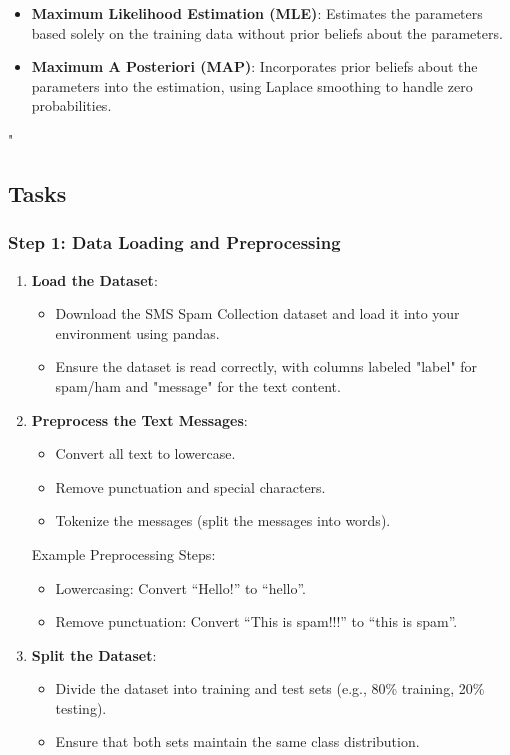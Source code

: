 \documentclass{article}
\begin{document}
\begin{itemize}
    \item \textbf{Maximum Likelihood Estimation (MLE)}: Estimates the parameters based solely on the training data without prior beliefs about the parameters.
    \item \textbf{Maximum A Posteriori (MAP)}: Incorporates prior beliefs about the parameters into the estimation, using Laplace smoothing to handle zero probabilities.
\end{itemize}

"

\subsection*{Tasks}

\subsubsection*{Step 1: Data Loading and Preprocessing}
\begin{enumerate}
    \item \textbf{Load the Dataset}:
    \begin{itemize}
        \item Download the SMS Spam Collection dataset and load it into your environment using pandas.
        \item Ensure the dataset is read correctly, with columns labeled "label" for spam/ham and "message" for the text content.
    \end{itemize}
    
    \item \textbf{Preprocess the Text Messages}:
    \begin{itemize}
        \item Convert all text to lowercase.
        \item Remove punctuation and special characters.
        \item Tokenize the messages (split the messages into words).
    \end{itemize}
    Example Preprocessing Steps:
    \begin{itemize}
        \item Lowercasing: Convert ``Hello!'' to ``hello''.
        \item Remove punctuation: Convert ``This is spam!!!'' to ``this is spam''.
    \end{itemize}
    
    \item \textbf{Split the Dataset}:
    \begin{itemize}
        \item Divide the dataset into training and test sets (e.g., 80\% training, 20\% testing).
        \item Ensure that both sets maintain the same class distribution.
    \end{itemize}
\end{enumerate}
\end{document}
